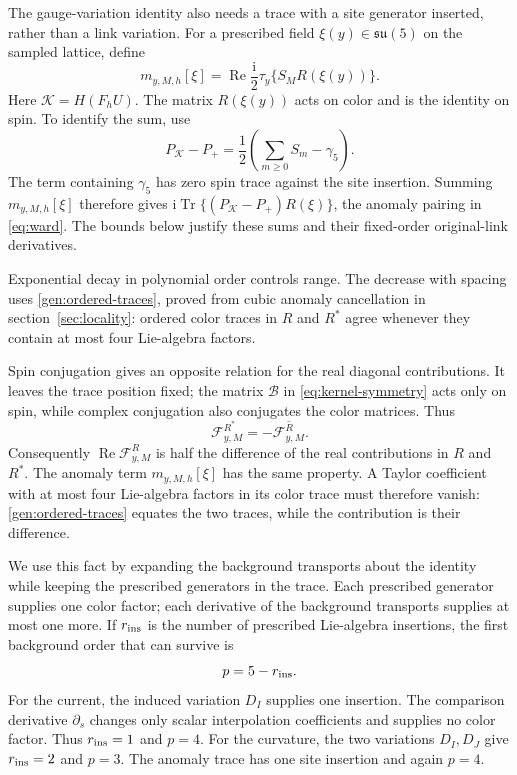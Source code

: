 \documentclass[11pt,a4paper]{article}
\theoremstyle{remark}
\DeclareMathOperator{\Tr}{Tr}
\newcommand{\ii}{\mathrm i}
\begin{document}
The gauge-variation identity also needs a trace with a site generator
inserted, rather than a link variation. For a prescribed field
$\xi(y)\in\mathfrak{su}(5)$ on the sampled lattice, define
\begin{equation}
 m_{y,M,h}[\xi]
   =\operatorname{Re}\frac{\ii}{2}
          \tau_y\{S_M R(\xi(y))\}.
\end{equation}
Here $\mathcal K=H(F_hU)$. The matrix $R(\xi(y))$ acts on color
and is the identity on spin. To identify the sum, use
\begin{equation}
 P_{\mathcal K}-P_+
   =\frac12\left(\sum_{m\ge0}S_m-\gamma_5\right).
\end{equation}
The term containing $\gamma_5$ has zero spin trace against the site
insertion. Summing $m_{y,M,h}[\xi]$ therefore gives
$\ii\Tr\{(P_{\mathcal K}-P_+)R(\xi)\}$, the anomaly pairing
in \eqref{eq:ward}. The bounds below justify these sums and their
fixed-order original-link derivatives.

Exponential decay in polynomial order controls range. The decrease
with spacing uses \eqref{gen:ordered-traces}, proved from cubic anomaly
cancellation in section~\ref{sec:locality}: ordered color traces in
$R$ and $R^*$ agree whenever they contain at most four Lie-algebra
factors.

Spin conjugation gives an opposite relation for the real diagonal
contributions. It leaves the trace position fixed; the matrix $\mathcal B$ in
\eqref{eq:kernel-symmetry} acts only on spin, while complex conjugation
also conjugates the color matrices. Thus
\begin{equation}
 \mathcal F^{R^*}_{y,M}
       =-\overline{\mathcal F^R_{y,M}}.
\end{equation}
Consequently $\operatorname{Re}\mathcal F^R_{y,M}$ is half the
difference of the real contributions in $R$ and $R^*$. The anomaly
term $m_{y,M,h}[\xi]$ has the same property. A Taylor coefficient
with at most four Lie-algebra factors in its color trace must therefore
vanish: \eqref{gen:ordered-traces} equates the two traces, while the
contribution is their difference.

We use this fact by expanding the background transports about the
identity while keeping the prescribed generators in the trace. Each
prescribed generator supplies one color factor; each derivative of the
background transports supplies at most one more. If $r_{\rm ins}$
is the number of prescribed Lie-algebra insertions, the first background
order that can survive is
\begin{equation}
 p=5-r_{\rm ins}.
\end{equation}
For the current, the induced variation $D_I$ supplies one insertion.
The comparison derivative $\partial_s$ changes only scalar
interpolation coefficients and supplies no color factor. Thus
$r_{\rm ins}=1$ and $p=4$. For the curvature, the two variations
$D_I,D_J$ give $r_{\rm ins}=2$ and $p=3$. The anomaly trace has
one site insertion and again $p=4$.
\end{document}
